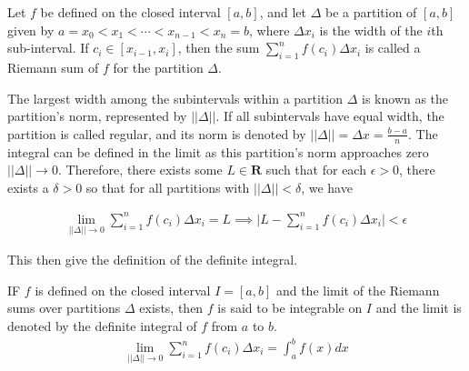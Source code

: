 \begin{defn}{1}
Let $f$ be defined on the closed interval $[a,b]$, and let $\Delta$ be a partition of $[a,b]$ given by $a=x_0 < x_1 < \cdots < x_{n-1} < x_n = b$, where $\Delta x_i$ is the width of the $i$th sub-interval. If $c_i \in [x_{i-1},x_i]$, then the sum $\sum_{i=1}^{n}f(c_i)\Delta x_i$ is called a Riemann sum of $f$ for the partition $\Delta$.
\end{defn}

The largest width among the subintervals within a partition $\Delta$ is known as the partition's norm, represented by $||\Delta||$. If all subintervals have equal width, the partition is called regular, and its norm is denoted by $||\Delta|| = \Delta x = \frac{b-a}{n}$. The integral can be defined in the limit as this partition's norm approaches zero $||\Delta|| \to 0$. Therefore, there exists some $L\in\mathbf{R}$ such that for each $\epsilon > 0$, there exists a $\delta > 0$ so that for all partitions with $||\Delta|| < \delta$, we have

\begin{align}
\lim_{||\Delta|| \to 0}\sum_{i=1}^{n}f(c_i)\Delta x_i = L \implies \bigg|L-\sum_{i=1}^{n}f(c_i)\Delta x_i\bigg| < \epsilon
\end{align}

This then give the definition of the definite integral.

\begin{defn}{1}
IF $f$ is defined on the closed interval $I=[a,b]$ and the limit of the Riemann sums over partitions $\Delta$ exists, then $f$ is said to be integrable on $I$ and the limit is denoted by the definite integral of $f$ from $a$ to $b$. 
\begin{align}
\lim_{||\Delta|| \to 0}\sum_{i=1}^{n}f(c_i)\Delta x_i = \int_a^b f(x)dx
\end{align}
\end{defn}















